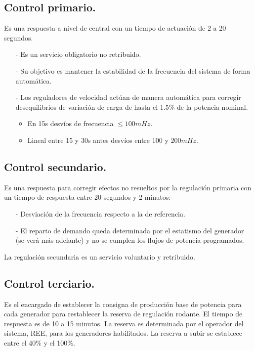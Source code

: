 \subsection{Control primario.}
Es una respuesta a nivel de central con un tiempo de actuación de 2 a 20 segundos.
\begin{itemize}
	\item [-] Es un servicio obligatorio no retribuido.
	\item [-] Su objetivo es mantener la estabilidad de la frecuencia del sistema de forma automática.
	\item [-] Los reguladores de velocidad actúan de manera automática para corregir desequilibrios de variación de carga de hasta el 1.5\% de la potencia nominal.
	\begin{itemize}
		\item En 15s desvíos de frecuencia $\le 100mHz$.
		\item Lineal entre 15 y 30s antes desvíos entre $100$ y $200mHz$.
	\end{itemize}
\end{itemize}
\subsection{Control secundario.}
Es una respuesta para corregir efectos no resueltos por la regulación primaria con un tiempo de respuesta entre 20 segundos y 2 minutos:
\begin{itemize}
	\item [-] Desviación de la frecuencia respecto a la de referencia.  
	\item [-] El reparto de demando queda determinada por el estatismo del generador (se verá más adelante) y no se cumplen los flujos de potencia programados.
\end{itemize}
La regulación secundaria es un servicio voluntario y retribuido. 
\subsection{Control terciario.}
Es el encargado de establecer la consigna de producción base de potencia para cada generador para restablecer la reserva de regulación rodante. El tiempo de respuesta es de 10 a 15 minutos. La reserva es determinada por el operador del sistema, REE, para los generadores habilitados. La reserva a subir se establece entre el 40\% y el 100\%.


